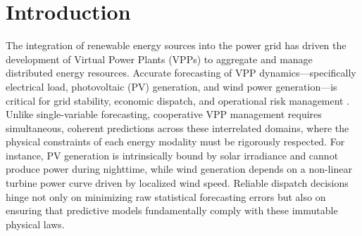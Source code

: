 \section{Introduction}

The integration of renewable energy sources into the power grid has driven the development of Virtual Power Plants (VPPs) to aggregate and manage distributed energy resources. Accurate forecasting of VPP dynamics---specifically electrical load, photovoltaic (PV) generation, and wind power generation---is critical for grid stability, economic dispatch, and operational risk management \cite{Ma2025,Cao2023,Qiu2024,Moreno2020,Wu2024}. Unlike single-variable forecasting, cooperative VPP management requires simultaneous, coherent predictions across these interrelated domains, where the physical constraints of each energy modality must be rigorously respected. For instance, PV generation is intrinsically bound by solar irradiance and cannot produce power during nighttime, while wind generation depends on a non-linear turbine power curve driven by localized wind speed. Reliable dispatch decisions hinge not only on minimizing raw statistical forecasting errors but also on ensuring that predictive models fundamentally comply with these immutable physical laws.

